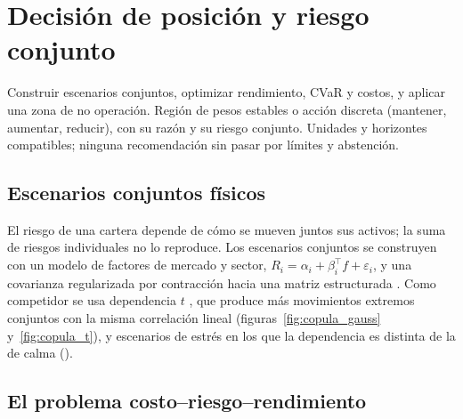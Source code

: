 \clearpage
\section{Decisión de posición y riesgo conjunto}\label{sec:decision}

{Construir escenarios conjuntos, optimizar rendimiento, CVaR y costos, y aplicar una zona de no
operación.}
{Región de pesos estables o acción discreta (mantener, aumentar, reducir), con su razón y su riesgo
conjunto.}
{Unidades y horizontes compatibles; ninguna recomendación sin pasar por límites y abstención.}

\subsection{Escenarios conjuntos físicos}\label{sec:escenarios}

El riesgo de una cartera depende de cómo se mueven juntos sus activos; la suma de riesgos individuales no
lo reproduce. Los escenarios conjuntos se construyen con un modelo de factores de mercado y sector,
$R_i=\alpha_i+\beta_i^\top f+\varepsilon_i$, y una covarianza regularizada por contracción hacia una matriz
estructurada \citep{ledoit2004}. Como competidor se usa dependencia $t$ \citep{demarta2005}, que produce
más movimientos extremos conjuntos con la misma correlación lineal
(figuras~\ref{fig:copula_gauss} y~\ref{fig:copula_t}), y escenarios de estrés en los que la dependencia es
distinta de la de calma ().




\subsection{El problema costo--riesgo--rendimiento}\label{sec:problema}

